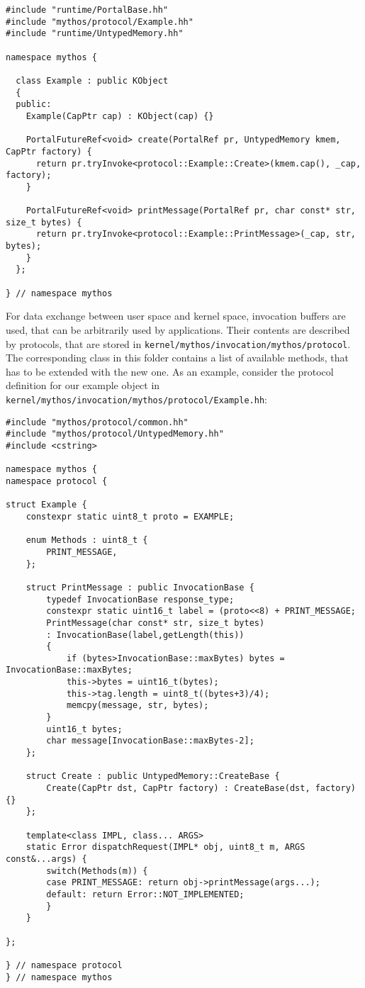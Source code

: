 \lstset{language=c++,caption=Object's Runtime Representation,label=lst:obj-runtime}
\begin{lstlisting}
#include "runtime/PortalBase.hh"
#include "mythos/protocol/Example.hh"
#include "runtime/UntypedMemory.hh"

namespace mythos {

  class Example : public KObject
  {
  public:
    Example(CapPtr cap) : KObject(cap) {}

    PortalFutureRef<void> create(PortalRef pr, UntypedMemory kmem, CapPtr factory) {
      return pr.tryInvoke<protocol::Example::Create>(kmem.cap(), _cap, factory);
    }

    PortalFutureRef<void> printMessage(PortalRef pr, char const* str, size_t bytes) {
      return pr.tryInvoke<protocol::Example::PrintMessage>(_cap, str, bytes);
    }
  };

} // namespace mythos
\end{lstlisting}

For data exchange between user space and kernel space, invocation buffers are
used, that can be arbitrarily used by applications. Their contents are
described by protocols, that are stored in
\texttt{kernel/mythos/invocation/mythos/protocol}. The corresponding class in
this folder contains a list of available methods, that has to be extended with
the new one. As an example, consider the protocol definition for our example object in
\texttt{kernel/mythos/invocation/mythos/protocol/Example.hh}: 

\lstset{language=c++,caption=Object's Protocol Definition,label=lst:obj-protocol}
\begin{lstlisting}
#include "mythos/protocol/common.hh"
#include "mythos/protocol/UntypedMemory.hh"
#include <cstring>

namespace mythos {
namespace protocol {

struct Example {
	constexpr static uint8_t proto = EXAMPLE;

	enum Methods : uint8_t {
		PRINT_MESSAGE,
	};

	struct PrintMessage : public InvocationBase {
		typedef InvocationBase response_type;
		constexpr static uint16_t label = (proto<<8) + PRINT_MESSAGE;
		PrintMessage(char const* str, size_t bytes)
		: InvocationBase(label,getLength(this))
		{
			if (bytes>InvocationBase::maxBytes) bytes = InvocationBase::maxBytes;
			this->bytes = uint16_t(bytes);
			this->tag.length = uint8_t((bytes+3)/4);
			memcpy(message, str, bytes);
		}
		uint16_t bytes;
		char message[InvocationBase::maxBytes-2];
	};

	struct Create : public UntypedMemory::CreateBase {
		Create(CapPtr dst, CapPtr factory) : CreateBase(dst, factory) {}
	};

	template<class IMPL, class... ARGS>
	static Error dispatchRequest(IMPL* obj, uint8_t m, ARGS const&...args) {
		switch(Methods(m)) {
		case PRINT_MESSAGE: return obj->printMessage(args...);
		default: return Error::NOT_IMPLEMENTED;
		}
	}

};

} // namespace protocol
} // namespace mythos
\end{lstlisting}


